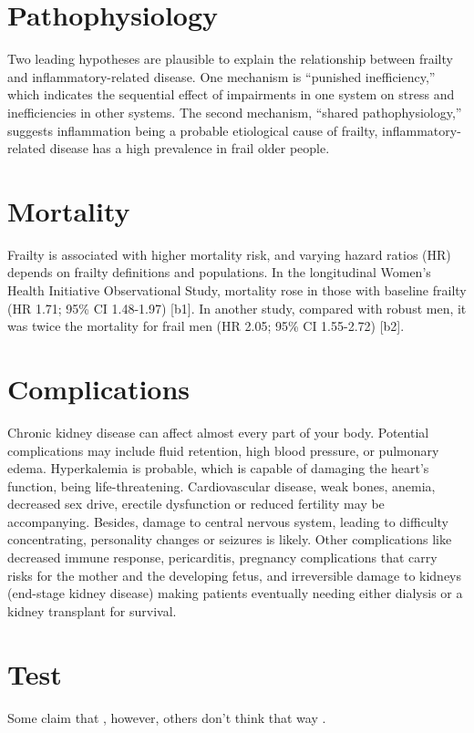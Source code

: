 \documentclass[jou]{apa6}
\begin{document}
\section{Pathophysiology}
Two leading hypotheses are plausible to explain the relationship between frailty and inflammatory-related disease.
One mechanism is “punished inefficiency,” which indicates the sequential effect of impairments in one system on stress and inefficiencies in other systems. The second mechanism, “shared pathophysiology,” suggests inflammation being a probable etiological cause of frailty, inflammatory-related disease has a high prevalence in frail older people.

\section{Mortality}
Frailty is associated with higher mortality risk, and varying hazard ratios (HR) depends on frailty definitions and populations. In the longitudinal Women’s Health Initiative Observational Study, mortality rose in those with baseline frailty (HR 1.71; 95\% CI 1.48-1.97) [b1]. In another study, compared with robust men, it was twice the mortality for frail men (HR 2.05; 95\% CI 1.55-2.72) [b2]. 

\section{Complications}
Chronic kidney disease can affect almost every part of your body. Potential complications may include fluid retention, high blood pressure, or pulmonary edema. Hyperkalemia is probable, which is capable of damaging the heart’s function, being life-threatening. Cardiovascular disease, weak bones, anemia, decreased sex drive, erectile dysfunction or reduced fertility may be accompanying. Besides, damage to central nervous system, leading to difficulty concentrating, personality changes or seizures is likely. Other complications like decreased immune response, pericarditis, pregnancy complications that carry risks for the mother and the developing fetus, and irreversible damage to kidneys (end-stage kidney disease) making patients eventually needing either dialysis or a kidney transplant for survival.

\section{Test}
Some claim that \cite{sanchez2017comparison}, however, others don't think that way \citep{mathiesen2019survival}.
\end{document}
